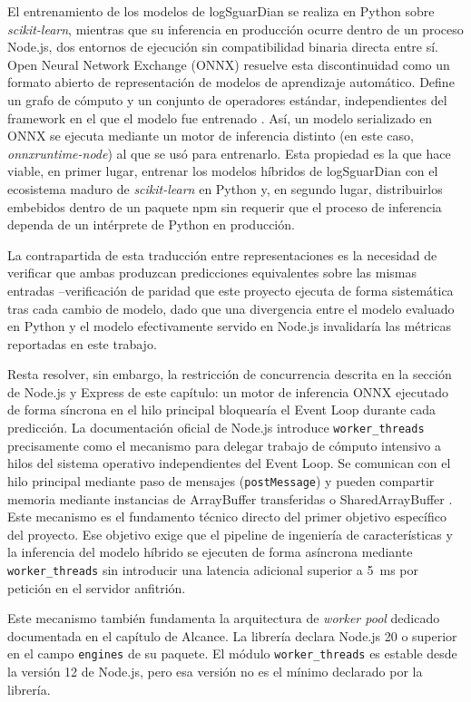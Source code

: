 El entrenamiento de los modelos de logSguarDian se realiza en Python sobre \textit{scikit-learn}, mientras que su inferencia en producción ocurre dentro de un proceso Node.js, dos entornos de ejecución sin compatibilidad binaria directa entre sí. Open Neural Network Exchange (ONNX) resuelve esta discontinuidad como un formato abierto de representación de modelos de aprendizaje automático. Define un grafo de cómputo y un conjunto de operadores estándar, independientes del framework en el que el modelo fue entrenado \parencite{bai2019}. Así, un modelo serializado en ONNX se ejecuta mediante un motor de inferencia distinto (en este caso, \textit{onnxruntime-node}) al que se usó para entrenarlo. Esta propiedad es la que hace viable, en primer lugar, entrenar los modelos híbridos de logSguarDian con el ecosistema maduro de \textit{scikit-learn} en Python y, en segundo lugar, distribuirlos embebidos dentro de un paquete npm sin requerir que el proceso de inferencia dependa de un intérprete de Python en producción.

La contrapartida de esta traducción entre representaciones es la necesidad de verificar que ambas produzcan predicciones equivalentes sobre las mismas entradas --verificación de paridad que este proyecto ejecuta de forma sistemática tras cada cambio de modelo, dado que una divergencia entre el modelo evaluado en Python y el modelo efectivamente servido en Node.js invalidaría las métricas reportadas en este trabajo.

Resta resolver, sin embargo, la restricción de concurrencia descrita en la sección de Node.js y Express de este capítulo: un motor de inferencia ONNX ejecutado de forma síncrona en el hilo principal bloquearía el Event Loop durante cada predicción. La documentación oficial de Node.js introduce \texttt{worker\_threads} precisamente como el mecanismo para delegar trabajo de cómputo intensivo a hilos del sistema operativo independientes del Event Loop. Se comunican con el hilo principal mediante paso de mensajes (\texttt{postMessage}) y pueden compartir memoria mediante instancias de ArrayBuffer transferidas o SharedArrayBuffer \parencite{nodejs-worker-threads}. Este mecanismo es el fundamento técnico directo del primer objetivo específico del proyecto. Ese objetivo exige que el pipeline de ingeniería de características y la inferencia del modelo híbrido se ejecuten de forma asíncrona mediante \texttt{worker\_threads} sin introducir una latencia adicional superior a 5~ms por petición en el servidor anfitrión.

Este mecanismo también fundamenta la arquitectura de \textit{worker pool} dedicado documentada en el capítulo de Alcance. La librería declara Node.js 20 o superior en el campo \texttt{engines} de su paquete. El módulo \texttt{worker\_threads} es estable desde la versión 12 de Node.js, pero esa versión no es el mínimo declarado por la librería.

